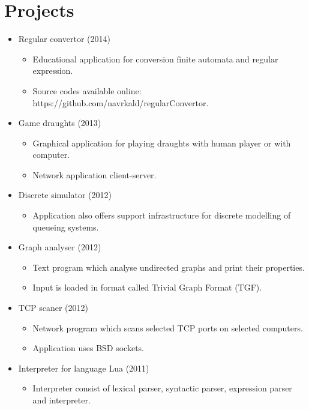\documentclass[11pt,a4paper,sans]{moderncv}        %
\begin{document}
\section{Projects}
{
\begin{itemize}
	\item Regular convertor (2014) 
	\begin{itemize}
		\item Educational application for conversion finite automata and regular expression.
		\item Source codes available online: https://github.com/navrkald/regularConvertor.
	\end{itemize}
	\item Game draughts (2013)
	\begin{itemize}
		\item Graphical application for playing draughts with human player or with computer.
		\item Network application client-server.
	\end{itemize}	 
\end{itemize}
}
{
\begin{itemize}
	\item Discrete simulator (2012)
	\begin{itemize}
		\item Application also offers support infrastructure for discrete modelling of queueing systems.
	\end{itemize}
\end{itemize}
}
{
	\begin{itemize}
		\item Graph analyser (2012)
		\begin{itemize}
			\item Text program which analyse undirected graphs and print their properties.
			\item Input is loaded in format called Trivial Graph Format (TGF).
		\end{itemize}
		\item TCP scaner (2012)
		\begin{itemize}
			\item Network program which scans selected TCP ports on selected computers.
			\item Application uses BSD sockets.
		\end{itemize}	
		\item Interpreter for language Lua (2011)
		\begin{itemize}
			\item Interpreter consist of lexical parser, syntactic parser, expression parser and interpreter.
		\end{itemize}
	\end{itemize}
}
\end{document}
